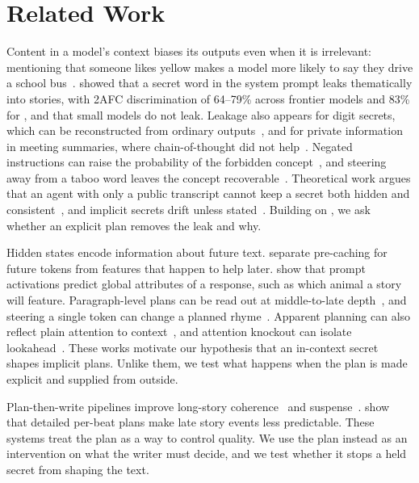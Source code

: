 \section{Related Work}
\label{sec:related}

Content in a model's context biases its outputs even when it is irrelevant: mentioning that someone likes yellow makes a model more likely to say they drive a school bus~\citep{gonen2025semantic}. \citet{holtzman2026secret} showed that a secret word in the system prompt leaks thematically into stories, with 2AFC discrimination of 64--79\% across frontier models and 83\% for \gemma, and that small models do not leak. Leakage also appears for digit secrets, which can be reconstructed from ordinary outputs~\citep{fairoze2026inadvertent}, and for private information in meeting summaries, where chain-of-thought did not help~\citep{mireshghallah2023confaide}. Negated instructions can raise the probability of the forbidden concept~\citep{mann2025whitebear}, and steering away from a taboo word leaves the concept recoverable~\citep{candussio2026dontsayit}. Theoretical work argues that an agent with only a public transcript cannot keep a secret both hidden and consistent~\citep{baldelli2026hangman}, and implicit secrets drift unless stated~\citep{luo2026beliefs}. Building on \citet{holtzman2026secret}, we ask whether an explicit plan removes the leak and why.

Hidden states encode information about future text. \citet{wu2024planahead} separate pre-caching for future tokens from features that happen to help later. \citet{dong2025emergent} show that prompt activations predict global attributes of a response, such as which animal a story will feature. Paragraph-level plans can be read out at middle-to-late depth~\citep{pochinkov2025parascopes}, and steering a single token can change a planned rhyme~\citep{maar2026plan}. Apparent planning can also reflect plain attention to context~\citep{nainani2025planning}, and attention knockout can isolate lookahead~\citep{men2024lookahead}. These works motivate our hypothesis that an in-context secret shapes implicit plans. Unlike them, we test what happens when the plan is made explicit and supplied from outside.

Plan-then-write pipelines improve long-story coherence~\citep{yang2022re3,yang2023doc} and suspense~\citep{xie2024suspense}. \citet{sui2026spoiler} show that detailed per-beat plans make late story events less predictable. These systems treat the plan as a way to control quality. We use the plan instead as an intervention on what the writer must decide, and we test whether it stops a held secret from shaping the text.

